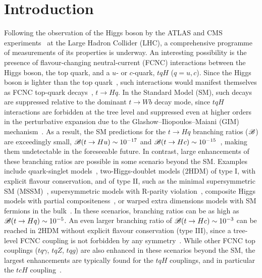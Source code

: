
\section{Introduction}
\label{sec:intro}

Following the observation of the Higgs boson by the ATLAS and CMS experiments~\cite{Aad:2012tfa,Chatrchyan:2012ufa} at
the Large Hadron Collider (LHC), a comprehensive programme of measurements of its properties is underway.
An interesting possibility is the presence of flavour-changing neutral-current (FCNC) interactions 
between the Higgs boson, the top quark, and a $u$- or $c$-quark, $tqH$ ($q=u,c$). Since the Higgs boson is lighter than the top quark~\cite{Aad:2015zhl}, 
such interactions would manifest themselves as FCNC top-quark decays~\cite{Agashe:2013hma}, $t\to H q$.  
In the Standard Model (SM), such decays are suppressed relative to the dominant $t\to Wb$ decay mode, since $tqH$ 
interactions are forbidden at the tree level and suppressed even at higher orders in the perturbative expansion due to the 
Glashow--Iliopoulos--Maiani (GIM) mechanism~\cite{Glashow:1970gm}.  As a result, the SM predictions for the $t \to Hq$ branching 
ratios ($\mathscr{B}$) are exceedingly small, $\mathscr{B}(t\to Hu) \sim 10^{-17} $ and $\mathscr{B}(t\to Hc) \sim 10^{-15}$~\cite{Eilam:1990zc,Mele:1998ag,AguilarSaavedra:2004wm,Zhang:2013xya}, making them undetectable in the foreseeable future.
In contrast, large enhancements of these branching ratios are possible in some scenario beyond the SM.
Examples include quark-singlet models~\cite{AguilarSaavedra:2002kr}, two-Higgs-doublet models (2HDM) of type I, with explicit flavour conservation,
and of type II, such as the minimal supersymmetric SM (MSSM)~\cite{Bejar:2000ub, Guasch:1999jp,Cao:2007dk,Cao:2014udj}, supersymmetric models
with R-parity violation~\cite{Eilam:2001dh}, composite Higgs models with partial compositeness~\cite{Azatov:2014lha}, 
or warped extra dimensions models with SM fermions in the bulk~\cite{Azatov:2009na}. 
In these scenarios, branching ratios can be as high as $\mathscr{B}(t\to Hq) \sim 10^{-5}$. 
An even larger branching ratio of  $\mathscr{B}(t\to Hc) \sim 10^{-3}$ can be reached in 2HDM without explicit flavour conservation (type III),
since a tree-level FCNC coupling is not forbidden by any symmetry~\cite{Cheng:1987rs,Baum:2008qm,Chen:2013qta,Chiang:2015cba,Crivellin:2015hha,Botella:2015hoa, Gori:2017tvg,Chiang:2017fjr}. 
While other FCNC top couplings ($tq\gamma$, $tqZ$, $tqg$) are also enhanced in these scenarios beyond the SM, 
the largest enhancements are typically found for the $tqH$ couplings, and in particular the $tcH$ coupling~\cite{Agashe:2013hma}.

